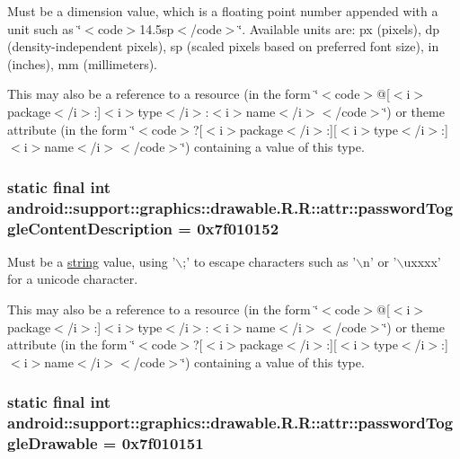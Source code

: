 Must be a dimension value, which is a floating point number appended with a unit such as \char`\"{}$<$code$>$14.5sp$<$/code$>$\char`\"{}. Available units are: px (pixels), dp (density-independent pixels), sp (scaled pixels based on preferred font size), in (inches), mm (millimeters). 

This may also be a reference to a resource (in the form \char`\"{}$<$code$>$@\mbox{[}$<$i$>$package$<$/i$>$:\mbox{]}$<$i$>$type$<$/i$>$:$<$i$>$name$<$/i$>$$<$/code$>$\char`\"{}) or theme attribute (in the form \char`\"{}$<$code$>$?\mbox{[}$<$i$>$package$<$/i$>$:\mbox{]}\mbox{[}$<$i$>$type$<$/i$>$:\mbox{]}$<$i$>$name$<$/i$>$$<$/code$>$\char`\"{}) containing a value of this type. \hypertarget{classandroid_1_1support_1_1graphics_1_1drawable_1_1_r_1_1attr_68dc340a467fda0afb37cb9e864b20a1}{
\subsubsection[{passwordToggleContentDescription}]{\setlength{\rightskip}{0pt plus 5cm}static final int android::support::graphics::drawable.R.R::attr::passwordToggleContentDescription = 0x7f010152}}
\label{classandroid_1_1support_1_1graphics_1_1drawable_1_1_r_1_1attr_68dc340a467fda0afb37cb9e864b20a1}


Must be a \hyperlink{classandroid_1_1support_1_1graphics_1_1drawable_1_1_r_1_1string}{string} value, using '$\backslash$;' to escape characters such as '$\backslash$n' or '$\backslash$uxxxx' for a unicode character. 

This may also be a reference to a resource (in the form \char`\"{}$<$code$>$@\mbox{[}$<$i$>$package$<$/i$>$:\mbox{]}$<$i$>$type$<$/i$>$:$<$i$>$name$<$/i$>$$<$/code$>$\char`\"{}) or theme attribute (in the form \char`\"{}$<$code$>$?\mbox{[}$<$i$>$package$<$/i$>$:\mbox{]}\mbox{[}$<$i$>$type$<$/i$>$:\mbox{]}$<$i$>$name$<$/i$>$$<$/code$>$\char`\"{}) containing a value of this type. \hypertarget{classandroid_1_1support_1_1graphics_1_1drawable_1_1_r_1_1attr_aa727908e4939b20621d8b5d734d2642}{
\subsubsection[{passwordToggleDrawable}]{\setlength{\rightskip}{0pt plus 5cm}static final int android::support::graphics::drawable.R.R::attr::passwordToggleDrawable = 0x7f010151}}
\label{classandroid_1_1support_1_1graphics_1_1drawable_1_1_r_1_1attr_aa727908e4939b20621d8b5d734d2642}


